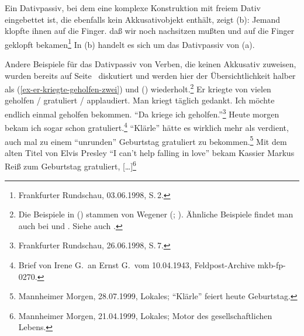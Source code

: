 
Ein Dativpassiv, bei dem eine komplexe Konstruktion mit freiem Dativ eingebettet ist,
die ebenfalls kein Akkusativobjekt enthält, zeigt (b):
\eal
\ex Jemand klopfte ihnen auf die Finger.
\ex\label{bsp-auf-die-finger-geklopft-bekommen}
daß wir noch nachsitzen mußten und auf die Finger geklopft bekamen\footnote{
        Frankfurter Rundschau, 03.06.1998, S.\,2.%
}
\zl
In (b) handelt es sich um das Dativpassiv von (a).
%

Andere Beispiele für das Dativpassiv von Verben, die keinen Akkusativ
zuweisen, wurden bereits auf Seite~\pageref{ex-er-kriegte-geholfen}
diskutiert und werden hier der Übersichtlichkeit halber
als (\ref{ex-er-kriegte-geholfen-zwei}) und () wiederholt.\footnote{
        Die Beispiele in () stammen von Wegener (\citeyear[]{Wegener85a}; \citeyear[]{Wegener90}).
        Ähnliche Beispiele findet man auch bei  und
        . Siehe auch .%
}
\eal
\label{ex-er-kriegte-geholfen-zwei}
\ex{}
Er kriegte von vielen geholfen / gratuliert / applaudiert.
\ex{} 
Man kriegt täglich gedankt.
\ex Ich möchte endlich einmal geholfen bekommen.
\zl
\eal
\ex
"`Da kriege ich geholfen."'\footnote{
Frankfurter Rundschau, 26.06.1998, S.\,7.%
}
\ex
Heute morgen bekam ich sogar schon gratuliert.\footnote{%
Brief von Irene G.\ an Ernst G.\ vom 10.04.1943, Feldpost-Archive mkb-fp-0270.}
\ex
"`Klärle"' hätte es wirklich mehr als verdient, auch mal zu einem "`unrunden"' Geburtstag gratuliert zu bekommen.\footnote{
Mannheimer Morgen, 28.07.1999, Lokales; "`Klärle"' feiert heute Geburtstag.%
}
\ex Mit dem alten Titel von Elvis Presley "`I can't help falling in love"' 
    bekam Kassier Markus Reiß zum Geburtstag gratuliert, [\ldots]\footnote{
Mannheimer Morgen, 21.04.1999, Lokales; Motor des gesellschaftlichen Lebens.%
}
\zl


